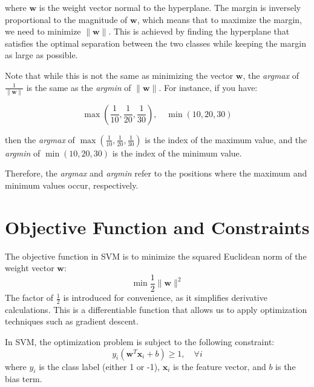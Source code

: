 where \( \mathbf{w} \) is the weight vector normal to the hyperplane. The margin is inversely proportional to the magnitude of \( \mathbf{w} \), which means that to maximize the margin, 
we need to minimize \( \| \mathbf{w} \| \). This is achieved by finding the hyperplane that satisfies the optimal separation between the two classes while keeping the margin as large as possible. 

Note that while this is not the same as minimizing the vector \( \mathbf{w} \), the \textit{argmax} of \( \frac{1}{\| \mathbf{w} \|} \) is the same as the \textit{argmin} of \( \| \mathbf{w} \| \). 
For instance, if you have:

\[
\max(\frac{1}{10}, \frac{1}{20}, \frac{1}{30}), \quad \min(10, 20, 30)
\]

then the \textit{argmax} of \( \max(\frac{1}{10}, \frac{1}{20}, \frac{1}{30}) \) is the index of the maximum value, and the \textit{argmin} of \( \min(10, 20, 30) \) is the index of the minimum value. 

Therefore, the \textit{argmax} and \textit{argmin} refer to the positions where the maximum and minimum values occur, respectively.

\section{Objective Function and Constraints}

The objective function in SVM is to minimize the squared Euclidean norm of the weight vector \( \mathbf{w} \):
\[
\min \frac{1}{2} \| \mathbf{w} \|^2
\]
The factor of \( \frac{1}{2} \) is introduced for convenience, as it simplifies derivative calculations. This is a differentiable function that allows us to apply optimization techniques such as gradient descent.

In SVM, the optimization problem is subject to the following constraint:
\[
y_i (\mathbf{w}^T \mathbf{x}_i + b) \geq 1, \quad \forall i
\]
where \( y_i \) is the class label (either 1 or -1), \( \mathbf{x}_i \) is the feature vector, and \( b \) is the bias term.

